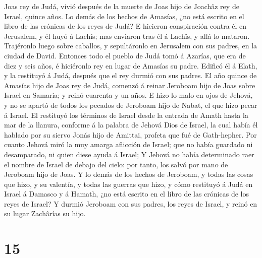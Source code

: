Joas rey de Judá, vivió después de la muerte de Joas hijo de Joachâz rey
de Israel, quince años.  Lo demás de los hechos de Amasías,
¿no está escrito en el libro de las crónicas de los reyes de Judá?
 E hicieron conspiración contra él en Jerusalem, y él huyó
á Lachîs; mas enviaron tras él á Lachîs, y allá lo mataron.
 Trajéronlo luego sobre caballos, y sepultáronlo en
Jerusalem con sus padres, en la ciudad de David.  Entonces
todo el pueblo de Judá tomó á Azarías, que era de diez y seis años, é
hiciéronlo rey en lugar de Amasías su padre.  Edificó él á
Elath, y la restituyó á Judá, después que el rey durmió con sus padres.
 El año quince de Amasías hijo de Joas rey de Judá, comenzó
á reinar Jeroboam hijo de Joas sobre Israel en Samaria; y reinó cuarenta
y un años.  E hizo lo malo en ojos de Jehová, y no se
apartó de todos los pecados de Jeroboam hijo de Nabat, el que hizo pecar
á Israel.  El restituyó los términos de Israel desde la
entrada de Amath hasta la mar de la llanura, conforme á la palabra de
Jehová Dios de Israel, la cual había él hablado por su siervo Jonás hijo
de Amittai, profeta que fué de Gath-hepher.  Por cuanto
Jehová miró la muy amarga aflicción de Israel; que no había guardado ni
desamparado, ni quien diese ayuda á Israel;  Y Jehová no
había determinado raer el nombre de Israel de debajo del cielo: por
tanto, los salvó por mano de Jeroboam hijo de Joas.  Y lo
demás de los hechos de Jeroboam, y todas las cosas que hizo, y su
valentía, y todas las guerras que hizo, y cómo restituyó á Judá en
Israel á Damasco y á Hamath, ¿no está escrito en el libro de las
crónicas de los reyes de Israel?  Y durmió Jeroboam con sus
padres, los reyes de Israel, y reinó en su lugar Zachârías su hijo.

\hypertarget{section-14}{%
\section{15}\label{section-14}}


